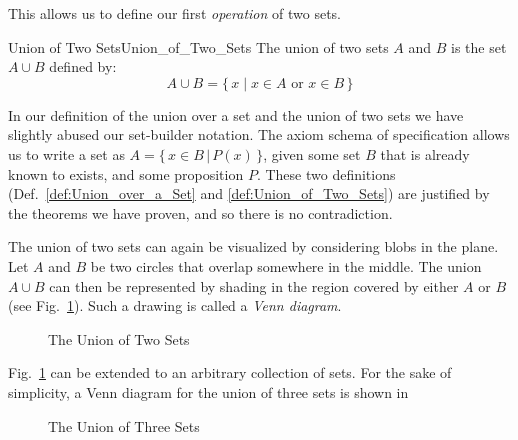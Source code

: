         This allows us to define our first \textit{operation} of two sets.
        \begin{fdefinition}{Union of Two Sets}{Union_of_Two_Sets}
            The \gls{union of two sets} $A$ and $B$ is the set $A\cup{B}$
            defined by:
            \begin{equation*}
                A\cup{B}=\big\{\,x\;|\;x\in{A}\textrm{ or }x\in{B}\,\big\}
            \end{equation*}
        \end{fdefinition}
        In our definition of the union over a set and the union of two sets
        we have slightly abused our set-builder notation. The axiom schema
        of specification allows us to write a set as
        $A=\{\,x\in{B}\,|\,P(x)\,\}$, given some set $B$ that is already known
        to exists, and some proposition $P$. These two definitions
        (Def.~\ref{def:Union_over_a_Set} and \ref{def:Union_of_Two_Sets})
        are justified by the theorems we have proven, and so there is no
        contradiction.
        \par\hfill\par
        The union of two sets can again be visualized by considering blobs
        in the plane. Let $A$ and $B$ be two circles that overlap somewhere in
        the middle. The union $A\cup{B}$ can then be represented by shading in
        the region covered by either $A$ or $B$
        (see Fig.~\ref{fig:Union_of_Two_Sets}). Such a drawing is called a
        \textit{Venn diagram}.
        \begin{figure}[H]
            \centering
            \captionsetup{type=figure}
            
            \caption{The Union of Two Sets}
            \label{fig:Union_of_Two_Sets}
        \end{figure}
        Fig.~\ref{fig:Union_of_Two_Sets} can be extended to an
        arbitrary collection of sets. For the sake of simplicity, a Venn
        diagram for the union of three sets is shown in
        \begin{figure}[H]
            \centering
            \captionsetup{type=figure}
            
            \caption{The Union of Three Sets}
            \label{fig:Union_of_Three_Sets}
        \end{figure}
